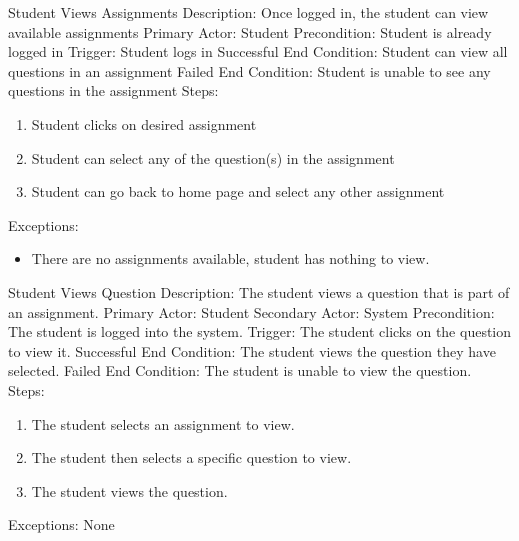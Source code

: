     \begin{section}{Student Views Assignments}
        Description: Once logged in, the student can view available assignments \newline
        Primary Actor: Student \newline
        Precondition: Student is already logged in \newline
        Trigger: Student logs in \newline
        Successful End Condition: Student can view all questions in an assignment \newline
        Failed End Condition: Student is unable to see any questions in the assignment \newline
        \newline
        Steps:
        \begin{enumerate}
            \item{Student clicks on desired assignment}
            \item{Student can select any of the question(s) in the assignment}
            \item{Student can go back to home page and select any other assignment}
        \end{enumerate}
        Exceptions:
        \begin{itemize}
            \item{There are no assignments available, student has nothing to view.}
        \end{itemize}
    \end{section}
    
    
    \begin{section}{Student Views Question}
        Description: The student views a question that is part of an assignment. \newline
        Primary Actor: Student \newline
        Secondary Actor: System \newline
        Precondition: The student is logged into the system. \newline
        Trigger: The student clicks on the question to view it. \newline
        Successful End Condition: The student views the question they have selected. \newline
        Failed End Condition: The student is unable to view the question. \newline
        \newline
        Steps:
        \begin{enumerate}
            \item{The student selects an assignment to view.}
            \item{The student then selects a specific question to view.}
            \item{The student views the question.}
        \end{enumerate}
        Exceptions: None
    \end{section}

